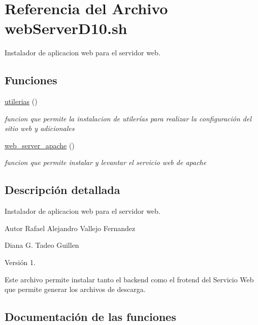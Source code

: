 \hypertarget{webServerD10_8sh}{}\section{Referencia del Archivo web\+Server\+D10.\+sh}
\label{webServerD10_8sh}


Instalador de aplicacion web para el servidor web.  


\subsection*{Funciones}
\begin{DoxyCompactItemize}
\item 
\hyperlink{webServerD10_8sh_abfb99f19dd3a69464f1a158be5052840}{utilerias} ()
\begin{DoxyCompactList}\small\item\em funcion que permite la instalacion de utilerías para realizar la configuración del sitio web y adicionales \end{DoxyCompactList}\item 
\mbox{\label{webServerD10_8sh_a97ceca1248f213ec432c92d8c5aaa6d7}} 
\hyperlink{webServerD10_8sh_a97ceca1248f213ec432c92d8c5aaa6d7}{web\+\_\+server\+\_\+apache} ()
\begin{DoxyCompactList}\small\item\em funcion que permite instalar y levantar el servicio web de apache \end{DoxyCompactList}\end{DoxyCompactItemize}


\subsection{Descripción detallada}
Instalador de aplicacion web para el servidor web. 

\begin{DoxyAuthor}{Autor}
Rafael Alejandro Vallejo Fernandez 

Diana G. Tadeo Guillen 
\end{DoxyAuthor}
\begin{DoxyVersion}{Versión}
1.
\end{DoxyVersion}
Este archivo permite instalar tanto el backend como el frotend del Servicio Web que permite generar los archivos de descarga. 

\subsection{Documentación de las funciones}
\mbox{\label{webServerD10_8sh_abfb99f19dd3a69464f1a158be5052840}} 
